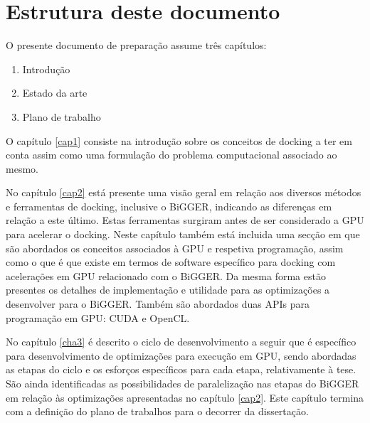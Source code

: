 \section{Estrutura deste documento}
O presente documento de preparação assume três capítulos:
\begin{enumerate}
\item{Introdução}
\item{Estado da arte}
\item{Plano de trabalho}
\end{enumerate}
O capítulo \ref{cap1} consiste na introdução sobre os conceitos de docking a ter em conta assim como uma formulação do problema computacional associado ao mesmo.\par No capítulo \ref{cap2} está presente uma visão geral em relação aos diversos métodos e ferramentas de docking, inclusive o BiGGER, indicando as diferenças em relação a este último. Estas ferramentas surgiram antes de ser considerado a GPU para acelerar o docking. Neste capítulo também está incluida uma secção em que são abordados os conceitos associados à GPU e respetiva programação, assim como o que é que existe em termos de software específico para docking com acelerações em GPU relacionado com o BiGGER. Da mesma forma estão presentes os detalhes de implementação e utilidade para as optimizações a desenvolver para o BiGGER. Também são abordados duas APIs para programação em GPU: CUDA e OpenCL.\par
No capítulo \ref{cha3} é descrito o ciclo de desenvolvimento a seguir que é específico para desenvolvimento de optimizações para execução em GPU, sendo abordadas as etapas do ciclo e os esforços específicos para cada etapa, relativamente à tese. São ainda identificadas as possibilidades de paralelização nas etapas do BiGGER em relação às optimizações apresentadas no capítulo \ref{cap2}. Este capítulo termina com a definição do plano de trabalhos para o decorrer da dissertação.




